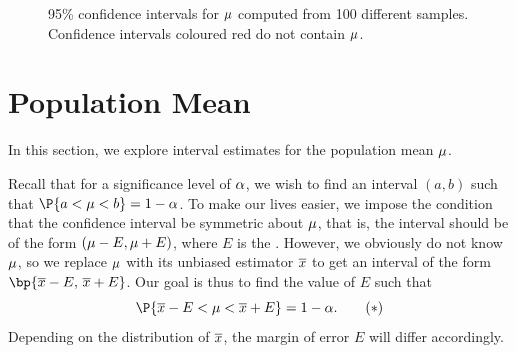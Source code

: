 \begin{figure}[H]
    \centering
    \caption{95\% confidence intervals for $\mu$ computed from 100 different samples. Confidence intervals coloured red do not contain $\mu$.}
\end{figure}

\section{Population Mean}\label{S:Confidence-Intervals-Mean}

In this section, we explore interval estimates for the population mean $\mu$.

Recall that for a significance level of $\alpha$, we wish to find an interval $(a, b)$ such that $\P{a < \m < b} = 1 - \a$. To make our lives easier, we impose the condition that the confidence interval be symmetric about $\mu$, that is, the interval should be of the form $(\mu - E, \mu + E)$, where $E$ is the . However, we obviously do not know $\mu$, so we replace $\mu$ with its unbiased estimator $\overline{x}$ to get an interval of the form $\bp{\ol{x} - E, \, \ol{x} + E}$. Our goal is thus to find the value of $E$ such that \[\P{\ol{x} - E < \m < \ol{x} + E} = 1 - \a. \tag{$\ast$}\] Depending on the distribution of $\overline{x}$, the margin of error $E$ will differ accordingly.

